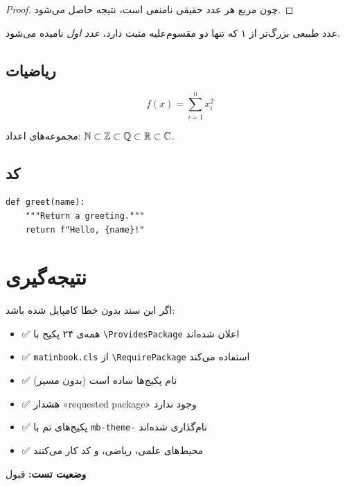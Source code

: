\documentclass{matinbook}
\begin{document}
\begin{proof}
    چون مربع هر عدد حقیقی نامنفی است، نتیجه حاصل می‌شود.
\end{proof}

\begin{definition}
    عدد طبیعی بزرگ‌تر از ۱ که تنها دو مقسوم‌علیه مثبت دارد،
    \emph{عدد اول} نامیده می‌شود.
\end{definition}

\subsection{ریاضیات}

\begin{equation}
    \label{eq:package-test}
    f(x) = \sum_{i=1}^{n} x_i^2
\end{equation}

مجموعه‌های اعداد: $\mathbb{N} \subset \mathbb{Z} \subset \mathbb{Q} \subset \mathbb{R} \subset \mathbb{C}$.

\subsection{کد}

\begin{latin}
\begin{verbatim}
def greet(name):
    """Return a greeting."""
    return f"Hello, {name}!"
\end{verbatim}
\end{latin}

\section{نتیجه‌گیری}
\label{sec:conclusion}

اگر این سند بدون خطا کامپایل شده باشد:

\begin{itemize}
    \item ✅ همه‌ی ۲۴ پکیج با \verb|\ProvidesPackage| اعلان شده‌اند
    \item ✅ \verb|matinbook.cls| از \verb|\RequirePackage| استفاده می‌کند
    \item ✅ نام پکیج‌ها ساده است (بدون مسیر)
    \item ✅ هشدار «requested package» وجود ندارد
    \item ✅ پکیج‌های تم با \verb|mb-theme-| نام‌گذاری شده‌اند
    \item ✅ محیط‌های علمی، ریاضی، و کد کار می‌کنند
\end{itemize}

\textbf{وضعیت تست:} قبول
\end{document}
